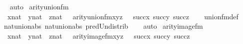 \begin{isabellebody}
\ \ \isamarkupfalse%
\ auto%
\endisatagproof
{\isafoldproof}%
%
\isadelimproof
\isanewline
%
\endisadelimproof
\isanewline
{}\isamarkupfalse%
\ arity{\isacharunderscore}{\kern0pt}union{\isacharunderscore}{\kern0pt}fm\ {\isacharcolon}{\kern0pt}\ \isanewline
\ \ {\isachardoublequoteopen}{\isasymlbrakk}\ x{\isasymin}nat\ {\isacharsemicolon}{\kern0pt}\ y{\isasymin}nat\ {\isacharsemicolon}{\kern0pt}\ z{\isasymin}nat\ {\isasymrbrakk}\ {\isasymLongrightarrow}\ arity{\isacharparenleft}{\kern0pt}union{\isacharunderscore}{\kern0pt}fm{\isacharparenleft}{\kern0pt}x{\isacharcomma}{\kern0pt}y{\isacharcomma}{\kern0pt}z{\isacharparenright}{\kern0pt}{\isacharparenright}{\kern0pt}\ {\isacharequal}{\kern0pt}\ {\isasymUnion}\ {\isacharbraceleft}{\kern0pt}succ{\isacharparenleft}{\kern0pt}x{\isacharparenright}{\kern0pt}{\isacharcomma}{\kern0pt}\ succ{\isacharparenleft}{\kern0pt}y{\isacharparenright}{\kern0pt}{\isacharcomma}{\kern0pt}\ succ{\isacharparenleft}{\kern0pt}z{\isacharparenright}{\kern0pt}{\isacharbraceright}{\kern0pt}{\isachardoublequoteclose}\isanewline
%
\isadelimproof
\ \ %
\endisadelimproof
%
\isatagproof
{}\isamarkupfalse%
\ union{\isacharunderscore}{\kern0pt}fm{\isacharunderscore}{\kern0pt}def\isanewline
\ \ \isamarkupfalse%
\ \ nat{\isacharunderscore}{\kern0pt}union{\isacharunderscore}{\kern0pt}abs{}\ nat{\isacharunderscore}{\kern0pt}union{\isacharunderscore}{\kern0pt}abs{}\ pred{\isacharunderscore}{\kern0pt}Un{\isacharunderscore}{\kern0pt}distrib\isanewline
\ \ \isamarkupfalse%
\ auto%
\endisatagproof
{\isafoldproof}%
%
\isadelimproof
\isanewline
%
\endisadelimproof
\isanewline
{}\isamarkupfalse%
\ arity{\isacharunderscore}{\kern0pt}image{\isacharunderscore}{\kern0pt}fm\ {\isacharcolon}{\kern0pt}\ \isanewline
\ \ {\isachardoublequoteopen}{\isasymlbrakk}\ x{\isasymin}nat\ {\isacharsemicolon}{\kern0pt}\ y{\isasymin}nat\ {\isacharsemicolon}{\kern0pt}\ z{\isasymin}nat\ {\isasymrbrakk}\ {\isasymLongrightarrow}\ arity{\isacharparenleft}{\kern0pt}image{\isacharunderscore}{\kern0pt}fm{\isacharparenleft}{\kern0pt}x{\isacharcomma}{\kern0pt}y{\isacharcomma}{\kern0pt}z{\isacharparenright}{\kern0pt}{\isacharparenright}{\kern0pt}\ {\isacharequal}{\kern0pt}\ {\isasymUnion}\ {\isacharbraceleft}{\kern0pt}succ{\isacharparenleft}{\kern0pt}x{\isacharparenright}{\kern0pt}{\isacharcomma}{\kern0pt}\ succ{\isacharparenleft}{\kern0pt}y{\isacharparenright}{\kern0pt}{\isacharcomma}{\kern0pt}\ succ{\isacharparenleft}{\kern0pt}z{\isacharparenright}{\kern0pt}{\isacharbraceright}{\kern0pt}{\isachardoublequoteclose}\isanewline

\end{isabellebody}
